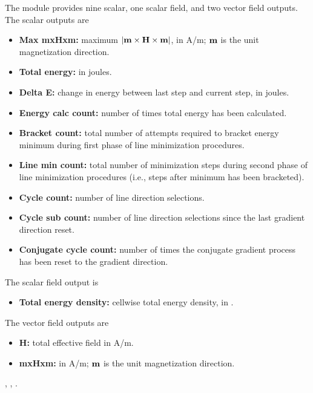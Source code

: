\begin{description}
The  module provides nine scalar, one scalar
 field, and two vector field outputs.  The scalar outputs are
\begin{itemize}
\item \textbf{Max mxHxm:} maximum $|\textbf{m}\times\textbf{H}\times\textbf{m}|$, in A/m;
   $\textbf{m}$ is the unit magnetization direction.
\item \textbf{Total energy:} in joules.
\item \textbf{Delta E:} change in energy between last step and current
   step, in joules.
\item \textbf{Energy calc count:} number of times total energy has been
   calculated.
\item \textbf{Bracket count:} total number of attempts required to
   bracket energy minimum during first phase of line minimization
   procedures.
\item \textbf{Line min count:} total number of minimization steps during
   second phase of line minimization procedures (i.e., steps after
   minimum has been bracketed).
\item \textbf{Cycle count:} number of line direction selections.
\item \textbf{Cycle sub count:} number of line direction selections
  since the last gradient direction reset.
\item \textbf{Conjugate cycle count:} number of times the conjugate gradient
   process has been reset to the gradient direction.
\end{itemize}

The scalar field output is
\begin{itemize}
\item \textbf{Total energy density:} cellwise total energy density, in
.
\end{itemize}

The vector field outputs are
\begin{itemize}
\item \textbf{H:} total effective field in A/m.
\item \textbf{mxHxm:} in A/m; $\textbf{m}$ is the unit magnetization
   direction.
\end{itemize}

\begin{ExampleMifs}
  , , .
\end{ExampleMifs}

\end{description}

